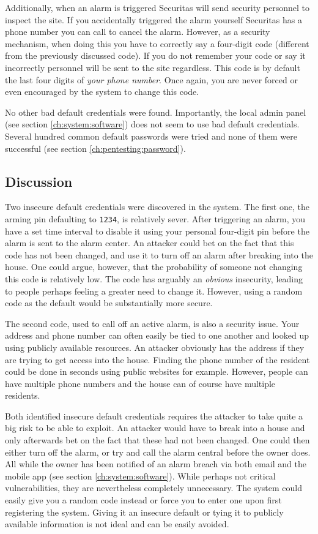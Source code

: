 Additionally, when an alarm is triggered Securitas will send security personnel to inspect the site. If you accidentally triggered the alarm yourself Securitas has a phone number you can call to cancel the alarm. However, as a security mechanism, when doing this you have to correctly say a four-digit code (different from the previously discussed code). If you do not remember your code or say it incorrectly personnel will be sent to the site regardless. This code is by default the last four digits of \textit{your phone number}. Once again, you are never forced or even encouraged by the system to change this code.

No other bad default credentials were found. Importantly, the local admin panel (see section \ref{ch:system:software}) does not seem to use bad default credentials. Several hundred common default passwords were tried and none of them were successful (see section \ref{ch:pentesting:password}).

\subsection{Discussion}
Two insecure default credentials were discovered in the system. The first one, the arming pin defaulting to \texttt{1234}, is relatively sever. After triggering an alarm, you have a set time interval to disable it using your personal four-digit pin before the alarm is sent to the alarm center. An attacker could bet on the fact that this code has not been changed, and use it to turn off an alarm after breaking into the house. One could argue, however, that the probability of someone not changing this code is relatively low. The code has arguably an \textit{obvious} insecurity, leading to people perhaps feeling a greater need to change it. However, using a random code as the default would be substantially more secure.

The second code, used to call off an active alarm, is also a security issue. Your address and phone number can often easily be tied to one another and looked up using publicly available resources. An attacker obviously has the address if they are trying to get access into the house. Finding the phone number of the resident could be done in seconds using public websites for example. However, people can have multiple phone numbers and the house can of course have multiple residents.

Both identified insecure default credentials requires the attacker to take quite a big risk to be able to exploit. An attacker would have to break into a house and only afterwards bet on the fact that these had not been changed. One could then either turn off the alarm, or try and call the alarm central before the owner does. All while the owner has been notified of an alarm breach via both email and the mobile app (see section \ref{ch:system:software}). While perhaps not critical vulnerabilities, they are nevertheless completely unnecessary. The system could easily give you a random code instead or force you to enter one upon first registering the system. Giving it an insecure default or tying it to publicly available information is not ideal and can be easily avoided.
